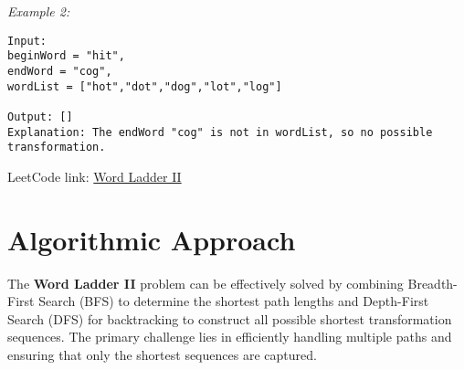 \textit{Example 2:}

\begin{verbatim}
Input:
beginWord = "hit",
endWord = "cog",
wordList = ["hot","dot","dog","lot","log"]

Output: []
Explanation: The endWord "cog" is not in wordList, so no possible transformation.
\end{verbatim}

LeetCode link: \href{https://leetcode.com/problems/word-ladder-ii/}{Word Ladder II}


\section*{Algorithmic Approach}

The \textbf{Word Ladder II} problem can be effectively solved by combining Breadth-First Search (BFS) to determine the shortest path lengths and Depth-First Search (DFS) for backtracking to construct all possible shortest transformation sequences. The primary challenge lies in efficiently handling multiple paths and ensuring that only the shortest sequences are captured.

